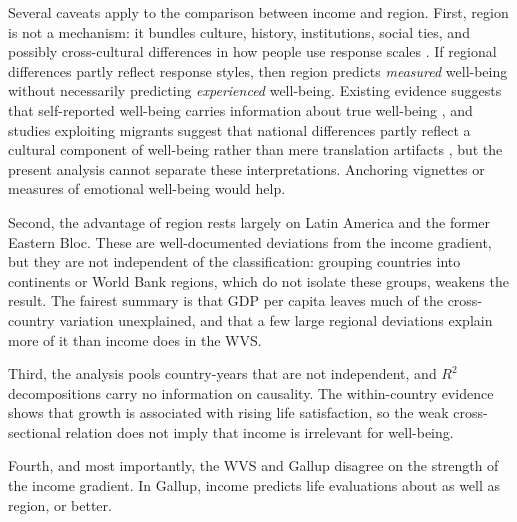 Several caveats apply to the comparison between income and region. First, region is not a mechanism: it bundles culture, history, institutions, social ties, and possibly cross-cultural differences in how people use response scales \citep{chen_response_1995,diener_personality_2003,exton_comparing_2015}. If regional differences partly reflect response styles, then region predicts \textit{measured} well-being without necessarily predicting \textit{experienced} well-being. Existing evidence suggests that self-reported well-being carries information about true well-being \citep{sandvik_subjective_1993,kaiser_scientific_2022}, and studies exploiting migrants suggest that national differences partly reflect a cultural component of well-being rather than mere translation artifacts \citep{senik_french_2014,exton_comparing_2015}, but the present analysis cannot separate these interpretations. Anchoring vignettes \citep{kapteyn_life_2010} or measures of emotional well-being would help.

Second, the advantage of region rests largely on Latin America and the former Eastern Bloc. These are well-documented deviations from the income gradient, but they are not independent of the classification: grouping countries into continents or World Bank regions, which do not isolate these groups, weakens the result. The fairest summary is that GDP per capita leaves much of the cross-country variation unexplained, and that a few large regional deviations explain more of it than income does in the WVS.

Third, the analysis pools country-years that are not independent, and $R^2$ decompositions carry no information on causality. The within-country evidence shows that growth is associated with rising life satisfaction, so the weak cross-sectional relation does not imply that income is irrelevant for well-being.

Fourth, and most importantly, the WVS and Gallup disagree on the strength of the income gradient. In Gallup, income predicts life evaluations about as well as region, or better.
